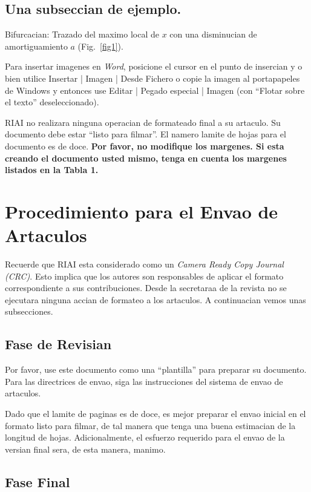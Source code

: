 \documentclass[5p,times,authoryear]{elsarticle}
\begin{document}
\subsection{Una subseccian de ejemplo.}
Bifurcacian: Trazado del maximo local de $x$ con una disminucian de amortiguamiento $a$ (Fig.~\ref{fig1}).

Para insertar imagenes en \emph{Word}, posicione el cursor en el punto de insercian y o bien utilice Insertar | Imagen | Desde Fichero o copie la imagen al portapapeles de Windows y entonces use Editar | Pegado especial | Imagen (con ``Flotar sobre el texto'' deseleccionado).

RIAI no realizara ninguna operacian de formateado final a su artaculo. Su documento debe estar ``listo para filmar''. El namero lamite de hojas para el documento es de doce. {\bf Por favor, no modifique los margenes. Si esta creando el documento usted mismo, tenga en cuenta los margenes listados en la Tabla 1.}

\section{Procedimiento para el Envao de Artaculos}

Recuerde que RIAI esta considerado como un \emph{Camera Ready Copy Journal (CRC)}. Esto implica que los autores son responsables de aplicar el formato correspondiente a sus contribuciones. Desde la secretaraa de la revista no se ejecutara ninguna accian de formateo a los artaculos. A continuacian vemos unas subsecciones.

\subsection{Fase de Revisian}

Por favor, use este documento como una ``plantilla'' para preparar su documento. Para las directrices de envao, siga las instrucciones del sistema de envao de artaculos.

Dado que el lamite de paginas es de doce, es mejor preparar el envao inicial en el formato listo para filmar, de tal manera que tenga una buena estimacian de la longitud de hojas. Adicionalmente, el esfuerzo requerido para el envao de la versian final sera, de esta manera, manimo.

\subsection{Fase Final}
\end{document}
